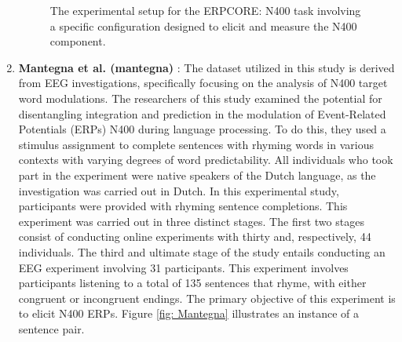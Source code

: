 \begin{enumerate}
\begin{figure}
    \caption{The experimental setup for the ERPCORE: N400 task involving a specific configuration designed to elicit and measure the N400 component. \cite{erpcore}}
    \label{fig:ERPCORE}
    
    
\end{figure}

\item \textbf{Mantegna et al. (mantegna)} \cite{mantegna2019distinguishing}: The dataset utilized in this study is derived from EEG investigations, specifically focusing on the analysis of N400 target word modulations. The researchers of this study examined the potential for disentangling integration and prediction in the modulation of Event-Related Potentials (ERPs) N400 during language processing. To do this, they used a stimulus assignment to complete sentences with rhyming words in various contexts with varying degrees of word predictability. All individuals who took part in the experiment were native speakers of the Dutch language, as the investigation was carried out in Dutch. In this experimental study, participants were provided with rhyming sentence completions. This experiment was carried out in three distinct stages. The first two stages consist of conducting online experiments with thirty and, respectively, 44 individuals. The third and ultimate stage of the study entails conducting an EEG experiment involving 31 participants. This experiment involves participants listening to a total of 135 sentences that rhyme, with either congruent or incongruent endings. The primary objective of this experiment is to elicit N400 ERPs. Figure \ref{fig: Mantegna} illustrates an instance of a sentence pair. 


\end{enumerate}
